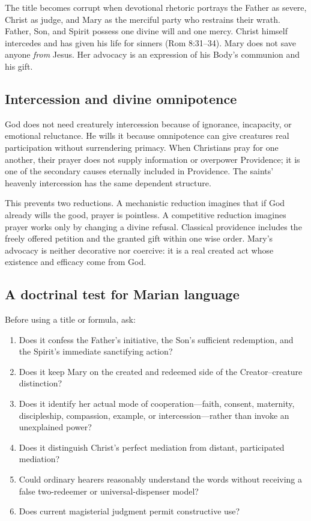 The title becomes corrupt when devotional rhetoric portrays the Father as severe, Christ as judge, and Mary as the merciful party who restrains their wrath. Father, Son, and Spirit possess one divine will and one mercy. Christ himself intercedes and has given his life for sinners (Rom 8:31--34). Mary does not save anyone \emph{from} Jesus. Her advocacy is an expression of his Body's communion and his gift.

\subsection{Intercession and divine omnipotence}

God does not need creaturely intercession because of ignorance, incapacity, or emotional reluctance. He wills it because omnipotence can give creatures real participation without surrendering primacy. When Christians pray for one another, their prayer does not supply information or overpower Providence; it is one of the secondary causes eternally included in Providence. The saints' heavenly intercession has the same dependent structure.

This prevents two reductions. A mechanistic reduction imagines that if God already wills the good, prayer is pointless. A competitive reduction imagines prayer works only by changing a divine refusal. Classical providence includes the freely offered petition and the granted gift within one wise order. Mary's advocacy is neither decorative nor coercive: it is a real created act whose existence and efficacy come from God.

\subsection{A doctrinal test for Marian language}

Before using a title or formula, ask:

\begin{enumerate}
  \item Does it confess the Father's initiative, the Son's sufficient redemption, and the Spirit's immediate sanctifying action?
  \item Does it keep Mary on the created and redeemed side of the Creator--creature distinction?
  \item Does it identify her actual mode of cooperation---faith, consent, maternity, discipleship, compassion, example, or intercession---rather than invoke an unexplained power?
  \item Does it distinguish Christ's perfect mediation from distant, participated mediation?
  \item Could ordinary hearers reasonably understand the words without receiving a false two-redeemer or universal-dispenser model?
  \item Does current magisterial judgment permit constructive use?
\end{enumerate}

